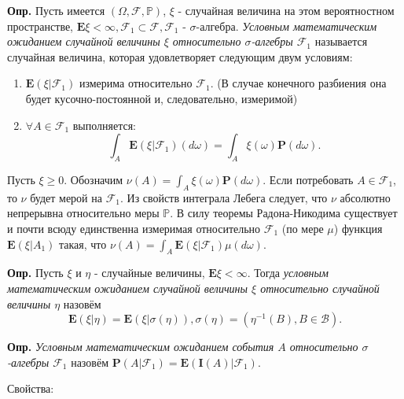 \documentclass[oneside,final,14pt]{extreport}
\newcommand\mydef{{\bf Опр.}}
\theoremstyle{definition}
\begin{document}
\mydef{} Пусть имеется $(\Omega, \mathcal{F}, \mathbb{P})$, $\xi$ - случайная величина на этом вероятностном пространстве, $\mathbf{E} \xi<\infty, \mathcal{F}_{1} \subset \mathcal{F}, \mathcal{F}_{1}$ - $\sigma$-алгебра. {\it Условным математическим ожиданием случайной величины $\xi$ относительно $\sigma$-алгебры $\mathcal{F}_1$} называется случайная величина, которая удовлетворяет следующим двум условиям:
\begin{enumerate}
    \item $\mathbf{E}\left(\xi | \mathcal{F}_{1}\right)$ измерима относительно $\mathcal{F}_1$. (В случае конечного разбиения она будет кусочно-постоянной и, следовательно, измеримой)
    \item $\forall A \in \mathcal{F}_1$ выполняется:
    $$\int_{A} \mathbf{E}\left(\xi | \mathcal{F}_{1}\right)(d \omega)=\int_{A} \xi(\omega) \mathbf{P}(d \omega).$$
\end{enumerate}

Пусть $\xi \geqslant 0.$ Обозначим $\nu(A) =\int_{A} \xi(\omega) \mathbf{P}(d \omega)$. Если потребовать $A \in \mathcal{F}_1$, то $\nu$ будет мерой на $\mathcal{F}_1$. Из свойств интеграла Лебега следует, что $\nu$ абсолютно непрерывна относительно меры $\mathbb{P}$. В силу теоремы Радона-Никодима существует и почти всюду единственна измеримая относительно $\mathcal{F}_1$ (по мере $\mu$) функция $\mathbf{E}\left(\xi | A_{1}\right)$ такая, что $\nu(A)=\int_{A} \mathbf{E}\left(\xi | \mathcal{F}_{1}\right) \mu(d \omega)$.

\mydef{} Пусть $\xi$ и $\eta$ - случайные величины, $\mathbf{E} \xi<\infty$. Тогда {\it условным математическим ожиданием случайной величины $\xi$ относительно случайной величины $\eta$} назовём 
$$\mathbf{E}(\xi | \eta)=\mathbf{E}(\xi | \sigma(\eta)), \sigma(\eta)=\left(\eta^{-1}(B), B \in \mathcal{B}\right).$$

\mydef{} {\it Условным математическим ожиданием события $A$ относительно $\sigma$-алгебры $\mathcal{F}_1$} назовём $\mathbf{P}\left(A | \mathcal{F}_{1}\right)=\mathbf{E}\left(\mathbf{I}(A) | \mathcal{F}_{1}\right).$

Свойства:
\end{document}
